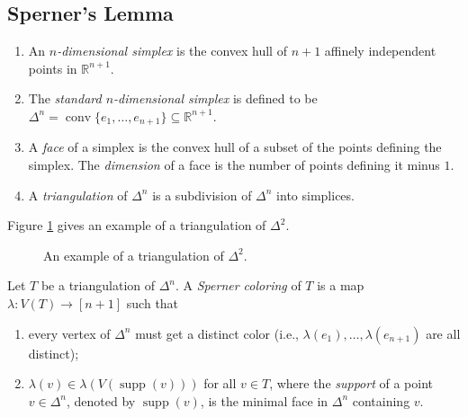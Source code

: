 \documentclass[letterpaper, reqno,12pt]{article}
\newcommand{\RR}{\mathbb{R}}
\DeclareMathOperator{\conv}{conv}
\DeclareMathOperator{\supp}{supp}
\begin{document}
\subsection{Sperner's Lemma}

\begin{definition}
  \noindent
  \begin{enumerate}[itemsep=0pt]
    \item An \emph{$n$-dimensional simplex} is the convex hull of $n + 1$ affinely independent points in $\RR^{n + 1}$.
    \item The \emph{standard $n$-dimensional simplex} is defined to be $\Delta^n = \conv\{ e_1, \ldots, e_{n + 1} \} \subseteq \RR^{n + 1}$.
    \item A \emph{face} of a simplex is the convex hull of a subset of the points defining the simplex. The \emph{dimension} of a face is the number of points defining it minus $1$.
    \item A \emph{triangulation} of $\Delta^n$ is a subdivision of $\Delta^n$ into simplices.
  \end{enumerate}
\end{definition}

Figure \ref{fig:triangulation} gives an example of a triangulation of $\Delta^2$.

\begin{figure}[h]
  \centering
  \caption{An example of a triangulation of $\Delta^2$.}
  \label{fig:triangulation}
\end{figure}

\begin{definition}
  Let $T$ be a triangulation of $\Delta^n$. A \emph{Sperner coloring} of $T$ is a map $\lambda : V(T) \to [n + 1]$ such that
  \begin{enumerate}[itemsep=0pt]
    \item every vertex of $\Delta^n$ must get a distinct color (i.e., $\lambda(e_1), \ldots, \lambda(e_{n + 1})$ are all distinct);
    \item $\lambda(v) \in \lambda(V(\supp(v)))$ for all $v \in T$, where the \emph{support} of a point $v \in \Delta^n$, denoted by $\supp(v)$, is the minimal face in $\Delta^n$ containing $v$.
  \end{enumerate}
\end{definition}
\end{document}
